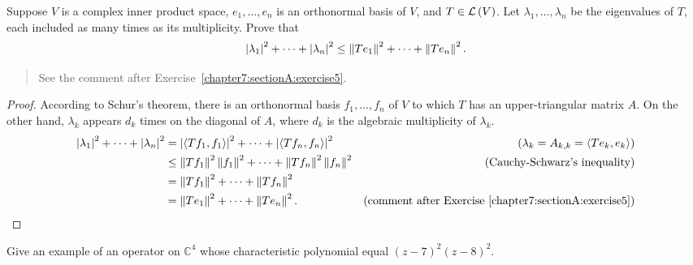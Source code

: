 \begin{exercise}\label{chapter8:sectionB:exercise10}
    Suppose $V$ is a complex inner product space, $e_{1}, \ldots, e_{n}$ is an orthonormal basis of $V$, and $T \in \mathcal{L}\left({V}\right)$. Let $\lambda_{1}, \ldots, \lambda_{n}$ be the eigenvalues of $T$, each included as many times as its multiplicity. Prove that
    \[
        \left\vert{\lambda_{1}}\right\vert^{2} + \cdots + \left\vert{\lambda_{n}}\right\vert^{2} \leq \left\Vert{Te_{1}}\right\Vert^{2} + \cdots + \left\Vert{Te_{n}}\right\Vert^{2}.
    \]
\end{exercise}

\begin{quote}
    See the comment after Exercise~\ref{chapter7:sectionA:exercise5}.
\end{quote}

\begin{proof}
    According to Schur's theorem, there is an orthonormal basis $f_{1}, \ldots, f_{n}$ of $V$ to which $T$ has an upper-triangular matrix $A$. On the other hand, $\lambda_{k}$ appears $d_{k}$ times on the diagonal of $A$, where $d_{k}$ is the algebraic multiplicity of $\lambda_{k}$.
    \begin{align*}
        \left\vert{\lambda_{1}}\right\vert^{2} + \cdots + \left\vert{\lambda_{n}}\right\vert^{2} & = \left\vert{\left\langle{Tf_{1}, f_{1}}\right\rangle}\right\vert^{2} + \cdots + \left\vert{\left\langle{Tf_{n}, f_{n}}\right\rangle}\right\vert^{2} & (\lambda_{k} = A_{k,k} = \left\langle{Te_{k}, e_{k}}\right\rangle)               \\
                                                               & \leq \left\Vert{Tf_{1}}\right\Vert^{2}\left\Vert{f_{1}}\right\Vert^{2} + \cdots + \left\Vert{Tf_{n}}\right\Vert^{2}\left\Vert{f_{n}}\right\Vert^{2}  & \text{(Cauchy-Schwarz's inequality)}                              \\
                                                               & = \left\Vert{Tf_{1}}\right\Vert^{2} + \cdots + \left\Vert{Tf_{n}}\right\Vert^{2}                                                                                                         \\
                                                               & = \left\Vert{Te_{1}}\right\Vert^{2} + \cdots + \left\Vert{Te_{n}}\right\Vert^{2}.                                    & \text{(comment after Exercise~\ref{chapter7:sectionA:exercise5})}
    \end{align*}
\end{proof}
\newpage

\begin{exercise}\label{chapter8:sectionB:exercise11}
    Give an example of an operator on $\mathbb{C}^{4}$ whose characteristic polynomial equal ${(z - 7)}^{2}{(z - 8)}^{2}$.
\end{exercise}

